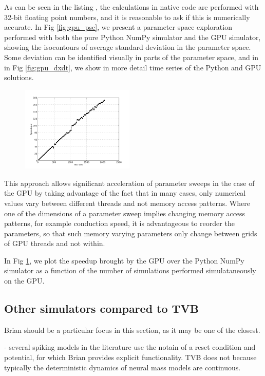 


    As can be seen in the listing , the calculations
    in native code are performed with 32-bit floating point numbers, and it
    is reasonable to ask if this is numerically accurate. In Fig 
    \ref{fig:gpu_pse}, we present a parameter space exploration performed with
    both the pure Python NumPy simulator and the GPU simulator, showing the 
    isocontours of average standard deviation in the parameter space. Some
    deviation can be identified visually in parts of the parameter space, and
    in in Fig \ref{fig:gpu_dxdt}, we show in more detail time series of 
    the Python and GPU solutions.

     \begin{figure}
        {\includegraphics[width=0.48\textwidth]{images/gpu_acceleration.png}}
        \caption{}
        \label{fig:gpu_acceleration}
    \end{figure}

    This approach allows significant acceleration of parameter sweeps in the
    case of the GPU by taking
    advantage of the fact that in many cases, only numerical values vary
    between different threads and not memory access patterns. Where one of the
    dimensions of a parameter sweep implies changing memory access patterns, 
    for example conduction speed, it is advantageous to reorder the parameters,
    so that such memory varying parameters only change between grids of GPU
    threads and not within.

    In Fig \ref{fig:gpu_acceleration}, we plot the speedup brought by the GPU
    over the Python NumPy simulator as a function of the number of simulations 
    performed simulataneously on the GPU.


\subsection{Other simulators compared to TVB}

    Brian should be a particular focus in this section, as it may
    be one of the closest. 

    - several spiking models in the literature use the notain of a reset
        condition and potential, for which Brian provides explicit
        functionality. TVB does not because typically the deterministic
        dynamics of neural mass models are continuous.
